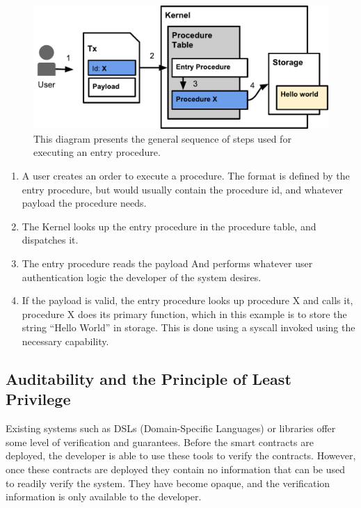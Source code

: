 \documentclass[english,a4paper]{article}
\begin{document}
\begin{figure}[htbp]
\centering
\includegraphics[width=1\textwidth]{media/EntryProcedure.pdf}
\caption{This diagram presents the general sequence of steps used
for executing an entry procedure.}
\end{figure}


\begin{enumerate}
\def\labelenumi{\arabic{enumi}.}
\item
  A user creates an order to execute a procedure. The format is defined
  by the entry procedure, but would usually contain the procedure id,
  and whatever payload the procedure needs.
\item
  The Kernel looks up the entry procedure in the procedure table, and
  dispatches it.
\item
  The entry procedure reads the payload And performs whatever user
  authentication logic the developer of the system desires.
\item
  If the payload is valid, the entry procedure looks up procedure X and
  calls it, procedure X does its primary function, which in this example
  is to store the string ``Hello World'' in storage. This is done using
  a syscall invoked using the necessary capability.
\end{enumerate}

\subsection{Auditability and the Principle of Least
Privilege}\label{auditability-and-the-principle-of-least-privilege}
Existing systems such as DSLs (Domain-Specific Languages) or libraries
offer some level of verification and guarantees. Before the smart
contracts are deployed, the developer is able to use these tools to
verify the contracts. However, once these contracts are deployed they
contain no information that can be used to readily verify the system.
They have become opaque, and the verification information is only
available to the developer.
\end{document}
